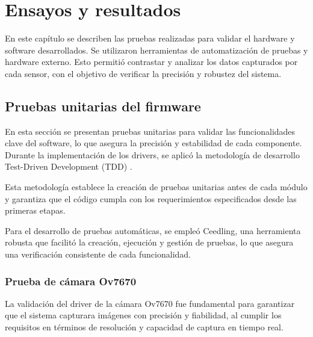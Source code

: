 
\chapter{Ensayos y resultados} %

\label{Chapter4} %
En este capítulo se describen las pruebas realizadas para validar el hardware y software desarrollados. Se utilizaron herramientas de automatización de pruebas y hardware externo. Esto permitió contrastar y analizar los datos capturados por cada sensor, con el objetivo de verificar la precisión y robustez del sistema.


\section{Pruebas unitarias del firmware}
\label{sec:pruebas_unitarias}

En esta sección se presentan pruebas unitarias para validar las funcionalidades clave del software, lo que asegura la precisión y estabilidad de cada componente. Durante la implementación de los drivers, se aplicó la metodología de desarrollo Test-Driven Development (TDD) \citep{ieee2023}.

Esta metodología establece la creación de pruebas unitarias antes de cada módulo y garantiza que el código cumpla con los requerimientos especificados desde las primeras etapas.

Para el desarrollo de pruebas automáticas, se empleó Ceedling, una herramienta robusta que facilitó la creación, ejecución y gestión de pruebas, lo que asegura una verificación consistente de cada funcionalidad.

\subsection{Prueba de cámara Ov7670}

La validación del driver de la cámara Ov7670 fue fundamental para garantizar que el sistema capturara imágenes con precisión y fiabilidad, al cumplir los requisitos en términos de resolución y capacidad de captura en tiempo real.

